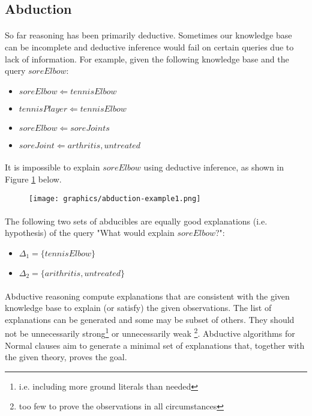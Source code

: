 \documentclass{article}
\theoremstyle{plain}
\theoremstyle{definition}
\begin{document}
\begin{multicols}{2}
\subsection{Abduction}

\paragraph{} So far reasoning has been primarily deductive. Sometimes our knowledge base can be incomplete and deductive inference would fail on certain queries due to lack of information. For example, given the following knowledge base and the query $soreElbow$:

\begin{itemize}
\setlength\itemsep{0.1em}
\item[] $soreElbow \Leftarrow tennisElbow$
\item[] $tennisPlayer \Leftarrow tennisElbow$
\item[] $soreElbow \Leftarrow soreJoints$
\item[] $soreJoint \Leftarrow arthritis, untreated$
\end{itemize}

\paragraph{} It is impossible to explain $soreElbow$ using deductive inference, as shown in Figure \ref{fig:abduction-example1} below.

\begin{figure}[H]
\centering
\texttt{[image: graphics/abduction-example1.png]}
\caption{}
\label{fig:abduction-example1}
\end{figure}

\paragraph{} The following two sets of abducibles are equally good explanations (i.e. hypothesis) of the query "What would explain $soreElbow$?":

\begin{itemize}
\item $\Delta_1 = \{tennisElbow\}$
\item $\Delta_2 = \{arithritis, untreated\}$
\end{itemize}

\paragraph{} Abductive reasoning compute explanations that are consistent with the given knowledge base to explain (or satisfy) the given observations. The list of explanations can be generated and some may be subset of others. They should not be unnecessarily strong\footnote{i.e. including more ground literals than needed} or unnecessarily weak \footnote{too few to prove the observations in all circumstances}. Abductive algorithms for Normal clauses aim to generate a minimal set of explanations that, together with the given theory, proves the goal.


\end{multicols}
\end{document}
